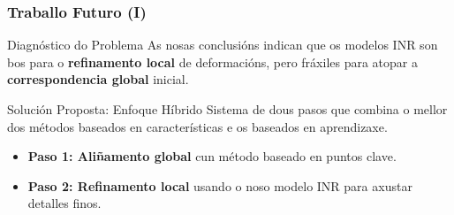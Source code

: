 \documentclass[xcolor=dvipsnames]{beamer}
\begin{document}
\begin{frame}
    \frametitle{Traballo Futuro (I)}
    
    \begin{block}{Diagnóstico do Problema}
        As nosas conclusións indican que os modelos INR son bos para o \textbf{refinamento local} de deformacións, pero fráxiles para atopar a \textbf{correspondencia global} inicial.
    \end{block}
    
    \begin{alertblock}{Solución Proposta: Enfoque Híbrido}
        Sistema de dous pasos que combina o mellor dos métodos baseados en características e os baseados en aprendizaxe.
    \end{alertblock}
    
    \begin{itemize}
        \item \textbf{Paso 1: Aliñamento global} cun método baseado en puntos clave.
        \item \textbf{Paso 2: Refinamento local} usando o noso modelo INR para axustar detalles finos.
    \end{itemize}
    
\end{frame}
\end{document}
